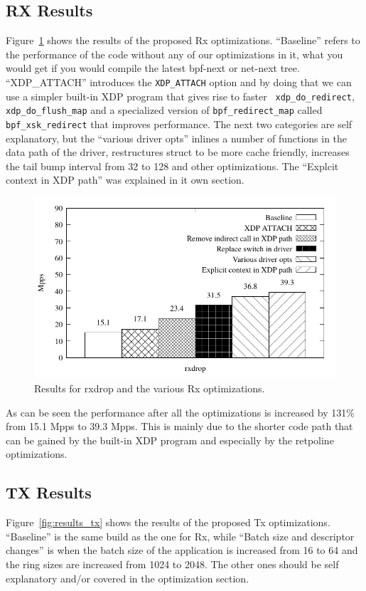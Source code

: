 \documentclass[9pt,numbers,reprint]{sigplanconf}
\begin{document}
\subsection{RX Results}
\label{sec:exp:rxres}


Figure~\ref{fig:results_rx} shows the results of the proposed Rx
optimizations. ``Baseline'' refers to the performance of the code
without any of our optimizations in it, what you would get if you
would compile the latest bpf-next or net-next tree.  ``XDP\_ATTACH''
introduces the {\tt XDP\_ATTACH} option and by doing that we can use a
simpler built-in XDP program that gives rise to faster {\tt
  xdp\_do\_redirect}, {\tt xdp\_do\_flush\_map} and a specialized
version of {\tt bpf\_redirect\_map} called {\tt bpf\_xsk\_redirect}
that improves performance. The next two categories are self
explanatory, but the ``various driver opts'' inlines a number of
functions in the data path of the driver, restructures struct to be
more cache friendly, increases the tail bump interval from 32 to 128
and other optimizations. The ``Explcit context in XDP path'' was
explained in it own section.

\begin{figure}[ht]
\centering
\includegraphics[width=.5\textwidth]{results_rx.pdf}
\caption{Results for rxdrop and the various Rx optimizations.}
\label{fig:results_rx}
\end{figure}

As can be seen the performance after all the optimizations is
increased by 131\% from 15.1 Mpps to 39.3 Mpps. This is mainly due to
the shorter code path that can be gained by the built-in XDP program
and especially by the retpoline optimizations.


\subsection{TX Results}
\label{sec:exp:txres}

Figure~\ref{fig:results_tx} shows the results of the proposed Tx
optimizations. ``Baseline'' is the same build as the one for Rx,
while ``Batch size and descriptor changes'' is when the batch
size of the application is increased from 16 to 64 and the ring sizes
are increased from 1024 to 2048. The other ones should be self
explanatory and/or covered in the optimization section.
\end{document}
